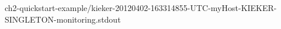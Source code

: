 \setTextListing

{ch2-quickstart-example/kieker-20120402-163314855-UTC-myHost-KIEKER-SINGLETON-monitoring.stdout}